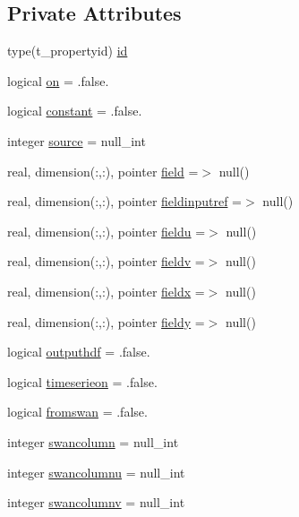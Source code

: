 \subsection*{Private Attributes}
\begin{DoxyCompactItemize}
\item 
type(t\+\_\+propertyid) \mbox{\hyperlink{structmodulewaves_1_1t__waveproperty_a627b70d66b6f0fcb4a15d8edb5bf2581}{id}}
\item 
logical \mbox{\hyperlink{structmodulewaves_1_1t__waveproperty_a0c47afc88c05dfaff311328d0d8e9ebf}{on}} = .false.
\item 
logical \mbox{\hyperlink{structmodulewaves_1_1t__waveproperty_ae0a73aa40848627c65262855c4482db7}{constant}} = .false.
\item 
integer \mbox{\hyperlink{structmodulewaves_1_1t__waveproperty_a5fd41d12ea6a3e6c3c52a88efaba222a}{source}} = null\+\_\+int
\item 
real, dimension(\+:,\+:), pointer \mbox{\hyperlink{structmodulewaves_1_1t__waveproperty_a7164f8318762069e0a8e9525f321aa25}{field}} =$>$ null()
\item 
real, dimension(\+:,\+:), pointer \mbox{\hyperlink{structmodulewaves_1_1t__waveproperty_a222b59b389c511466346ebb6ab9865c9}{fieldinputref}} =$>$ null()
\item 
real, dimension(\+:,\+:), pointer \mbox{\hyperlink{structmodulewaves_1_1t__waveproperty_a8a545337713cb93b1f8906467d5b94b2}{fieldu}} =$>$ null()
\item 
real, dimension(\+:,\+:), pointer \mbox{\hyperlink{structmodulewaves_1_1t__waveproperty_a9f3e021e15d5d39893673dbe477e7b5f}{fieldv}} =$>$ null()
\item 
real, dimension(\+:,\+:), pointer \mbox{\hyperlink{structmodulewaves_1_1t__waveproperty_af13c502d52430f01393595a31bb44b94}{fieldx}} =$>$ null()
\item 
real, dimension(\+:,\+:), pointer \mbox{\hyperlink{structmodulewaves_1_1t__waveproperty_a1c943c4bff1f9a3a33e8a465374bc187}{fieldy}} =$>$ null()
\item 
logical \mbox{\hyperlink{structmodulewaves_1_1t__waveproperty_ad1eaeb7cea29a1021313beeea41c05a6}{outputhdf}} = .false.
\item 
logical \mbox{\hyperlink{structmodulewaves_1_1t__waveproperty_a1e81faed73037648d91cb668e56ad778}{timeserieon}} = .false.
\item 
logical \mbox{\hyperlink{structmodulewaves_1_1t__waveproperty_ac36bde2e6fca093c40ed51dc22a7c177}{fromswan}} = .false.
\item 
integer \mbox{\hyperlink{structmodulewaves_1_1t__waveproperty_a0a13e8b64d3da39c7360bed740fb1a21}{swancolumn}} = null\+\_\+int
\item 
integer \mbox{\hyperlink{structmodulewaves_1_1t__waveproperty_a8c8a0374207d176b4ffe18fb3adb2ec3}{swancolumnu}} = null\+\_\+int
\item 
integer \mbox{\hyperlink{structmodulewaves_1_1t__waveproperty_a1e7a6c31095ef36aba95a30d596f6744}{swancolumnv}} = null\+\_\+int
\end{DoxyCompactItemize}


